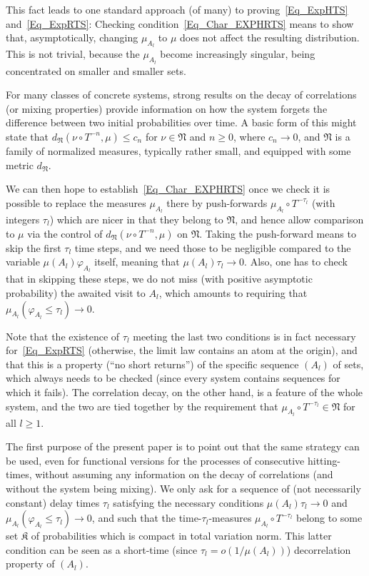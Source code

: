 \documentclass[AHL,Unicode,longabstracts]{cedram}
\newcommand{\frkN}{\mathfrak{N}}
\newcommand{\frkK}{\mathfrak{K}}
\begin{document}
This fact leads to one standard approach (of many) to proving~\eqref{Eq_ExpHTS} and~\eqref{Eq_ExpRTS}: Checking condition~\eqref{Eq_Char_EXPHRTS} means to show that, asymptotically, changing $\mu_{A_{l}}$ to $\mu$ does not affect the resulting distribution. This is not trivial, because the $\mu_{A_{l}}$ become increasingly singular, being concentrated on smaller and smaller sets.

For many classes of concrete systems, strong results on the decay of correlations (or mixing properties) provide information on how the system forgets the difference between two initial probabilities over time. A basic form of this might state that $d_{\frkN}(\nu\circ T^{-n},\mu)\leq c_{n}$ for $\nu\in\frkN$ and $n\geq0$, where $c_{n}\rightarrow0$, and $\frkN$ is a family of normalized measures, typically rather small, and equipped with some metric $d_{\frkN}$.

We can then hope to establish~\eqref{Eq_Char_EXPHRTS} once we check it is possible to replace the measures $\mu_{A_{l}}$ there by push-forwards $\mu_{A_{l}}\circ T^{-\tau_{l}}$ (with integers $\tau_{l}$) which are nicer in that they belong to $\frkN$, and hence allow comparison to $\mu$ via the control of $d_{\frkN}(\nu\circ T^{-n},\mu)$ on $\frkN$. Taking the push-forward means to skip the first $\tau_{l}$ time steps, and we need those to be negligible compared to the variable $\mu(A_{l})\varphi _{A_{l}}$ itself, meaning that $\mu(A_{l})\tau_{l}\rightarrow0$. Also, one has to check that in skipping these steps, we do not miss (with positive asymptotic probability) the awaited visit to $A_{l}$, which amounts to requiring that $\mu_{A_{l}}(\varphi_{A_{l}}\leq\tau_{l})\longrightarrow0$.

Note that the existence of $\tau_{l}$ meeting the last two conditions is in fact necessary for~\eqref{Eq_ExpRTS} (otherwise, the limit law contains an atom at the origin), and that this is a property (``no short returns'') of the specific sequence $(A_{l})$ of sets, which always needs to be checked (since every system contains sequences for which it fails). The correlation decay, on the other hand, is a feature of the whole system, and the two are tied together by the requirement that $\mu_{A_{l} }\circ T^{-\tau_{l}}\in\frkN$ for all $l\geq1$.




The first purpose of the present paper is to point out that the same strategy can be used, even for functional versions for the processes of consecutive hitting-times, without assuming any information on the decay of correlations (and without the system being mixing). We only ask for a sequence of (not necessarily constant) delay times $\tau_{l}$ satisfying the necessary conditions $\mu(A_{l})\tau_{l}\rightarrow0$ and $\mu_{A_{l}}(\varphi_{A_{l} }\leq\tau_{l})\longrightarrow0$, and such that the time-$\tau_{l}$-measures $\mu_{A_{l}}\circ T^{-\tau_{l}}$ belong to some set $\frkK$ of probabilities which is compact in total variation norm. This latter condition can be seen as a short-time (since $\tau_{l}=o(1/\mu(A_{l}))$) decorrelation property of $(A_{l})$.
\end{document}
